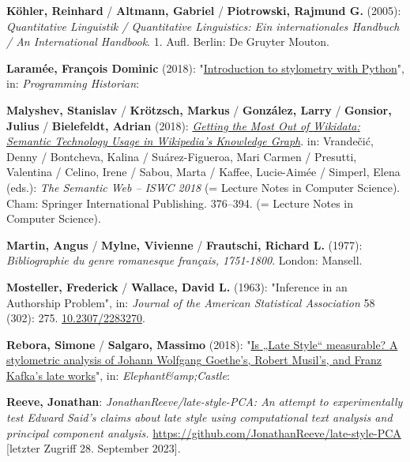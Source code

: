 \documentclass[
  12pt,
  letterpaper,
  DIV=11,
  numbers=noendperiod]{scrreprt}
\newlength{\cslhangindent}
\newenvironment{CSLReferences}[2] %
 {\begin{list}{}{%
  \setlength{\itemindent}{0pt}
  \setlength{\leftmargin}{0pt}
  \setlength{\parsep}{0pt}
  \ifodd #1
   \setlength{\leftmargin}{\cslhangindent}
   \setlength{\itemindent}{-1\cslhangindent}
  \fi
  \setlength{\itemsep}{#2\baselineskip}}}
 {\end{list}}
\begin{document}
\begin{CSLReferences}{1}{0}
\textbf{Köhler, Reinhard} / \textbf{Altmann, Gabriel} /
\textbf{Piotrowski, Rajmund G.} (2005): \emph{Quantitative {Linguistik}
/ {Quantitative} {Linguistics}: {Ein} internationales {Handbuch} / {An}
{International} {Handbook}}. 1. Aufl. Berlin: De Gruyter Mouton.

\textbf{Laramée, François Dominic} (2018):
"\href{https://programminghistorian.org/en/lessons/introduction-to-stylometry-with-python}{Introduction
to stylometry with {Python}}", in: \emph{Programming Historian}:

\textbf{Malyshev, Stanislav} / \textbf{Krötzsch, Markus} /
\textbf{González, Larry} / \textbf{Gonsior, Julius} /
\textbf{Bielefeldt, Adrian} (2018):
\emph{\href{https://doi.org/10.1007/978-3-030-00668-6_23}{Getting the
{Most} {Out} of {Wikidata}: {Semantic} {Technology} {Usage} in
{Wikipedia}'s {Knowledge} {Graph}}}. in: Vrandečić, Denny / Bontcheva,
Kalina / Suárez-Figueroa, Mari Carmen / Presutti, Valentina / Celino,
Irene / Sabou, Marta / Kaffee, Lucie-Aimée / Simperl, Elena (eds.):
\emph{The {Semantic} {Web} -- {ISWC} 2018} (= Lecture {Notes} in
{Computer} {Science}). Cham: Springer International Publishing.
376--394. (= Lecture {Notes} in {Computer} {Science}).

\textbf{Martin, Angus} / \textbf{Mylne, Vivienne} / \textbf{Frautschi,
Richard L.} (1977): \emph{Bibliographie du genre romanesque français,
1751-1800}. London: Mansell.

\textbf{Mosteller, Frederick} / \textbf{Wallace, David L.} (1963):
"Inference in an {Authorship} {Problem}", in: \emph{Journal of the
American Statistical Association} 58 (302): 275.
\href{https://doi.org/10.2307/2283270}{10.2307/2283270}.

\textbf{Rebora, Simone} / \textbf{Salgaro, Massimo} (2018):
"\href{https://www.academia.edu/37943274/Is_Late_Style_measurable_A_stylometric_analysis_of_Johann_Wolfgang_Goethe_s_Robert_Musil_s_and_Franz_Kafka_s_late_works}{Is
{„{Late} {Style}``} measurable? {A} stylometric analysis of {Johann}
{Wolfgang} {Goethe}'s, {Robert} {Musil}'s, and {Franz} {Kafka}'s late
works}", in: \emph{Elephant\&amp;Castle}:

\textbf{Reeve, Jonathan}: \emph{{JonathanReeve}/late-style-{PCA}: {An}
attempt to experimentally test {Edward} {Said}'s claims about late style
using computational text analysis and principal component analysis.}
\url{https://github.com/JonathanReeve/late-style-PCA} {[}letzter Zugriff
28. September 2023{]}.


\end{CSLReferences}
\end{document}
